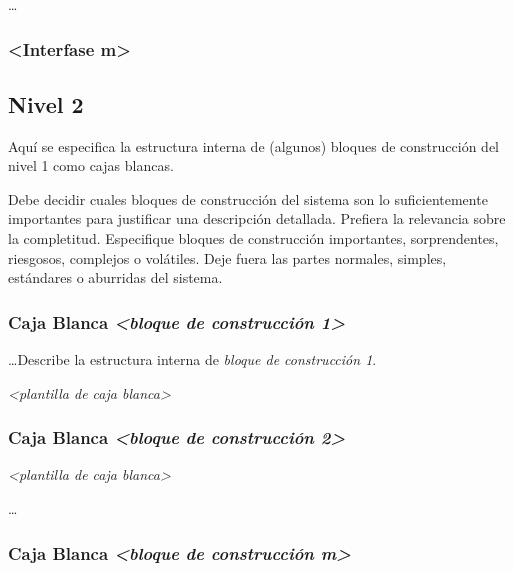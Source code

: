 \documentclass[]{article}
\begin{document}
\ldots{}

\hypertarget{__interfase_m}{%
\subsubsection{\textless{}Interfase
m\textgreater{}}\label{__interfase_m}}

\hypertarget{_nivel_2}{%
\subsection{Nivel 2}\label{_nivel_2}}

Aquí se especifica la estructura interna de (algunos) bloques de
construcción del nivel 1 como cajas blancas.

Debe decidir cuales bloques de construcción del sistema son lo
suficientemente importantes para justificar una descripción detallada.
Prefiera la relevancia sobre la completitud. Especifique bloques de
construcción importantes, sorprendentes, riesgosos, complejos o
volátiles. Deje fuera las partes normales, simples, estándares o
aburridas del sistema.

\hypertarget{_caja_blanca_emphasis_bloque_de_construcci_n_1_emphasis}{%
\subsubsection{\texorpdfstring{Caja Blanca \emph{\textless{}bloque de
construcción
1\textgreater{}}}{Caja Blanca \textless{}bloque de construcción 1\textgreater{}}}\label{_caja_blanca_emphasis_bloque_de_construcci_n_1_emphasis}}

\ldots{}Describe la estructura interna de \emph{bloque de construcción
1}.

\emph{\textless{}plantilla de caja blanca\textgreater{}}

\hypertarget{_caja_blanca_emphasis_bloque_de_construcci_n_2_emphasis}{%
\subsubsection{\texorpdfstring{Caja Blanca \emph{\textless{}bloque de
construcción
2\textgreater{}}}{Caja Blanca \textless{}bloque de construcción 2\textgreater{}}}\label{_caja_blanca_emphasis_bloque_de_construcci_n_2_emphasis}}

\emph{\textless{}plantilla de caja blanca\textgreater{}}

\ldots{}

\hypertarget{_caja_blanca_emphasis_bloque_de_construcci_n_m_emphasis}{%
\subsubsection{\texorpdfstring{Caja Blanca \emph{\textless{}bloque de
construcción
m\textgreater{}}}{Caja Blanca \textless{}bloque de construcción m\textgreater{}}}\label{_caja_blanca_emphasis_bloque_de_construcci_n_m_emphasis}}
\end{document}

